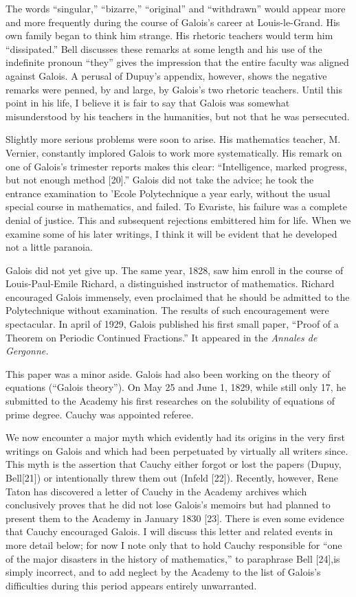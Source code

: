 \documentclass[12pt]{article}
\begin{document}
The words ``singular,'' ``bizarre,'' ``original'' and ``withdrawn'' would appear more and more frequently during the course of Galois's career at Louis-le-Grand. His own family began to think him strange. His rhetoric teachers would term him ``dissipated.'' Bell discusses these remarks at some length and his use of the indefinite pronoun ``they'' gives the impression that the entire faculty was aligned against Galois. A perusal of Dupuy's appendix, however, shows the negative remarks were penned, by and large, by Galois's two rhetoric teachers. Until this point in his life, I believe it is fair to say that Galois was somewhat misunderstood by his teachers in the humanities, but not that he was persecuted.

Slightly more serious problems were soon to arise. His mathematics teacher, M. Vernier, constantly implored Galois to work more systematically. His remark on one of Galois's trimester reports makes this clear: ``Intelligence, marked progress, but not enough method [20].'' Galois did not take the advice; he took the entrance examination to 'Ecole Polytechnique a year early, without the usual special course in mathematics, and failed. To Evariste, his failure was a complete denial of justice. This and subsequent rejections embittered him for life. When we examine some of his later writings, I think it will be evident that he developed not a little paranoia.

Galois did not yet give up. The same year, 1828, saw him enroll in the course of Louis-Paul-Emile Richard, a distinguished instructor of mathematics. Richard encouraged Galois immensely, even proclaimed that he should be admitted to the Polytechnique without examination. The results of such encouragement were spectacular. In april of 1929, Galois published his first small paper, ``Proof of a Theorem on Periodic Continued Fractions.'' It appeared in the {\it Annales de Gergonne.}

This paper was a minor aside. Galois had also been working on the theory of equations (``Galois theory''). On May 25 and June 1, 1829, while still only 17, he submitted to the Academy his first researches on the solubility of equations of prime degree. Cauchy was appointed referee.

We now encounter a major myth which evidently had its origins in the very first writings on Galois and which had been perpetuated by virtually all writers since. This myth is the assertion that Cauchy either forgot or lost the papers (Dupuy, Bell[21]) or intentionally threw them out (Infeld [22]). Recently, however, Rene Taton has discovered a letter of Cauchy in the Academy archives which conclusively proves that he did not lose Galois's memoirs but had planned to present them to the Academy in January 1830 [23]. There is even some evidence that Cauchy encouraged Galois. I will discuss this letter and related events in more detail below; for now I note only that to hold Cauchy responsible for ``one of the major disasters in the history of mathematics,'' to paraphrase Bell [24],is simply incorrect, and to add neglect by the Academy to the list of Galois's difficulties during this period appears entirely unwarranted.
\end{document}
